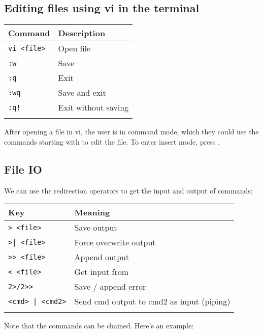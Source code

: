 \documentclass{article}
\begin{document}
\subsection{Editing files using vi in the terminal}
\begin{table}[H]
    \begin{tabular}{ll}
        \textbf{Command}      & \textbf{Description} \\ \hline
        \lstinline|vi <file>| & Open file            \\ \arrayrulecolor{lightgray}\hline
        \lstinline|:w|        & Save                 \\ \arrayrulecolor{lightgray}\hline
        \lstinline|:q|        & Exit                 \\ \arrayrulecolor{lightgray}\hline
        \lstinline|:wq|       & Save and exit        \\ \arrayrulecolor{lightgray}\hline
        \lstinline|:q!|       & Exit without saving  \\ \arrayrulecolor{lightgray}\hline
    \end{tabular}
\end{table}
After opening a file in vi, the user is in command mode, which they could use the commands starting with  to edit the file. To enter insert mode, press .

\subsection{File IO}
We can use the redirection operators to get the input and output of commands:
\begin{table}[H]
    \begin{tabular}{ll}
        \textbf{Key}               & \textbf{Meaning}                          \\ \hline
        \lstinline|> <file>|       & Save output                               \\ \arrayrulecolor{lightgray}\hline
        \lstinline+>| <file>+      & Force overwrite output                    \\ \arrayrulecolor{lightgray}\hline
        \lstinline|>> <file>|      & Append output                             \\ \arrayrulecolor{lightgray}\hline
        \lstinline|< <file>|       & Get input from                            \\ \arrayrulecolor{lightgray}\hline
        \lstinline|2>/2>>|         & Save / append error                       \\ \arrayrulecolor{lightgray}\hline
        \lstinline+<cmd> | <cmd2>+ & Send cmd output to cmd2 as input (piping) \\ \arrayrulecolor{lightgray}\hline
    \end{tabular}
\end{table}
Note that the commands can be chained. Here's an example: 
\end{document}
